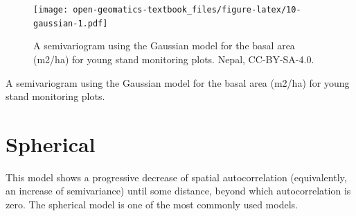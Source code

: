 \documentclass[
]{book}
\begin{document}
\begin{figure}
\centering
\texttt{[image: open-geomatics-textbook\_files/figure-latex/10-gaussian-1.pdf]}
\caption{\label{fig:10-gaussian}A semivariogram using the Gaussian model for the basal area (m2/ha) for young stand monitoring plots. Nepal, CC-BY-SA-4.0.}
\end{figure}

A semivariogram using the Gaussian model for the basal area (m2/ha) for young stand monitoring plots.

\hypertarget{spherical}{%
\section{Spherical}\label{spherical}}

This model shows a progressive decrease of spatial autocorrelation (equivalently, an increase of semivariance) until some distance, beyond which autocorrelation is zero. The spherical model is one of the most commonly used models.
\end{document}
